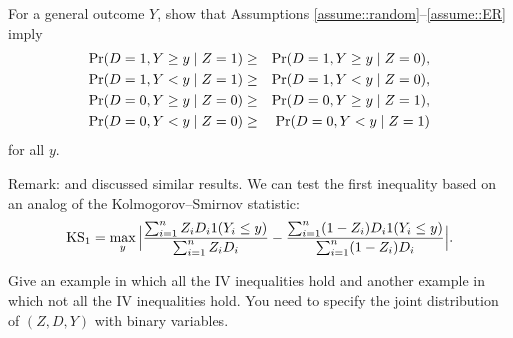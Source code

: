 \begin{HomeworkProblem}\label{exr:22-5}

For a general outcome $Y$, show that Assumptions \ref{assume::random}--\ref{assume::ER} imply
\begin{eqnarray*}
\operatorname{Pr}(D=1, Y\geq y\mid Z=1) &\geq & \operatorname{Pr}(D=1, Y\geq y\mid Z=0), \\
\operatorname{Pr}(D=1, Y <  y\mid Z=1) &\geq & \operatorname{Pr}(D=1, Y <  y\mid Z=0), \\
\operatorname{Pr}(D=0, Y\geq y\mid Z=0) &\geq & \operatorname{Pr}(D=0, Y\geq y\mid Z=1),\\
\operatorname{Pr}(D=0, Y <  y\mid Z=0) &\geq & \operatorname{Pr}(D=0, Y <  y\mid Z=1)
\end{eqnarray*}
for all $y$.

Remark:  \citet{imbens1997estimating} and \citet{kitagawa2015test} discussed similar results.  We can test the first inequality based on an analog of the Kolmogorov--Smirnov statistic:
\[
\text{KS}_1 = \max_{y} \Big |
\frac{  \sum_{i=1}^n Z_i D_i  1(Y_i \leq y)  }{ \sum_{i=1}^n Z_i D_i  } - \frac{  \sum_{i=1}^n (1-Z_i) D_i  1(Y_i \leq y)  }{ \sum_{i=1}^n (1-Z_i) D_i  }
\Big |.
\]



\end{HomeworkProblem}

\begin{HomeworkProblem}\label{exr:22-6}

Give an example in which all the IV inequalities hold and another example in which not all the IV inequalities hold. You need to specify the joint distribution of $(Z,D,Y)$ with binary variables.



\end{HomeworkProblem}


